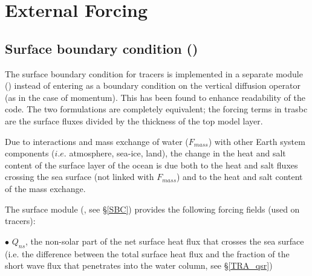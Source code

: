 \section{External Forcing}
\label{TRA_sbc_qsr_bbc}

\subsection   [Surface boundary condition (\textit{trasbc})]
			{Surface boundary condition ()}
\label{TRA_sbc}

The surface boundary condition for tracers is implemented in a separate 
module () instead of entering as a boundary condition on the vertical 
diffusion operator (as in the case of momentum). This has been found to 
enhance readability of the code. The two formulations are completely 
equivalent; the forcing terms in trasbc are the surface fluxes divided by 
the thickness of the top model layer. 

Due to interactions and mass exchange of water ($F_{mass}$) with other Earth system components ($i.e.$ atmosphere, sea-ice, land),
the change in the heat and salt content of the surface layer of the ocean is due both 
to the heat and salt fluxes crossing the sea surface (not linked with $F_{mass}$)
 and to the heat and salt content of the mass exchange.

The surface module (, see \S\ref{SBC}) provides the following 
forcing fields (used on tracers):

$\bullet$ $Q_{ns}$, the non-solar part of the net surface heat flux that crosses the sea surface 
(i.e. the difference between the total surface heat flux and the fraction of the short wave flux that 
penetrates into the water column, see \S\ref{TRA_qsr})

